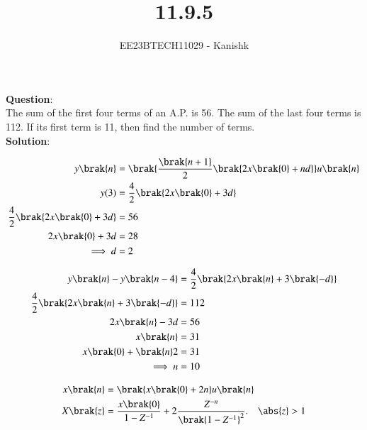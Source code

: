 \documentclass[journal,12pt,twocolumn]{IEEEtran}
\theoremstyle{remark}
\begin{document}

\vspace{3cm}

\title{11.9.5}
\author{EE23BTECH11029 - Kanishk}
\maketitle

\bigskip

\renewcommand{\thefigure}{\theenumi}
\renewcommand{\thetable}{\theenumi}
\textbf{Question}:\\ 
The sum of the first four terms of an A.P. is 56. The sum of the last four terms is
112. If its first term is 11, then find the number of terms.\\

\textbf{Solution}:\\ 

\begin{table}[ht]
    \centering
    \def\arraystretch{1.5}
    
    \label{}
\end{table}

\small
{}

\begin{align}
y\brak{n}&=\brak{\frac{\brak{n+1}}{2}\brak{2x\brak{0}+nd}}u\brak{n}\\
y(3)&=\frac{4}{2}\brak{2x\brak{0}+3d}\\
\frac{4}{2}\brak{2x\brak{0}+3d}&=56\\
2x\brak{0}+3d&=28\\
\implies d&=2
\end{align}

\begin{align}
y\brak{n}-y\brak{n-4}&=\frac{4}{2}\brak{2x\brak{n}+3\brak{-d}}\\
\frac{4}{2}\brak{2x\brak{n}+3\brak{-d}}&=112\\
2x\brak{n}-3d&=56\\
x\brak{n}&=31\\
x\brak{0}+\brak{n}2&=31\\
\implies n&=10
\end{align}


\begin{align}
x\brak{n}&=\brak{x\brak{0}+2n}u\brak{n}\\
X\brak{z}&=\frac{x\brak{0}}{1-Z^{-1}}+2\frac{Z^{-n}}{\brak{1-Z^{-1}}^{2}}.\quad \abs{z} > 1
\end{align}

\newpage
\end{document}
